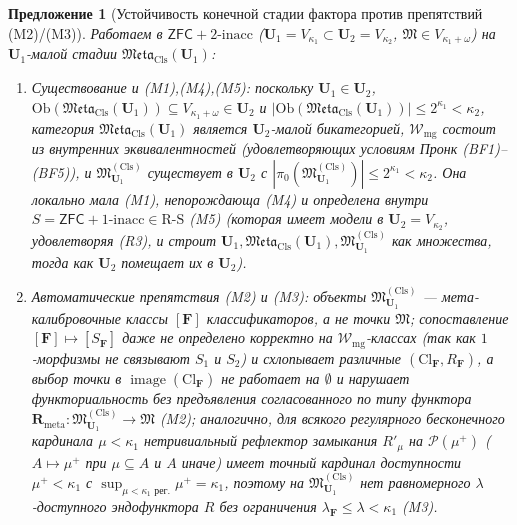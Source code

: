 \documentclass[11pt]{article}
\theoremstyle{plain}
\newtheorem{proposition}[theorem]{Предложение}
\theoremstyle{definition}
\newcommand{\RS}{\mathrm{R\text{-}S}}
\newcommand{\fM}{\mathfrak{M}}
\newcommand{\Meta}{\mathfrak{Meta}}
\newcommand{\Ob}{\mathrm{Ob}}
\newcommand{\Cl}{\mathrm{Cl}}
\newcommand{\ZFC}{\mathsf{ZFC}}
\DeclareMathOperator{\image}{image}
\begin{document}
\begin{proposition}[Устойчивость конечной стадии фактора против препятствий \textup{(M2)/(M3)}]\label{prop:meta-quotient-finite}
Работаем в $\ZFC + 2\text{-inacc}$ ($\mathbf{U}_1 = V_{\kappa_1} \subset \mathbf{U}_2 = V_{\kappa_2}$, $\fM \in V_{\kappa_1+\omega}$) на $\mathbf{U}_1$-малой стадии $\Meta_{\mathrm{Cls}}(\mathbf{U}_1)$:
\begin{enumerate}[nosep,label=(\roman*)]
\item \emph{Существование и \textup{(M1),(M4),(M5)}}: поскольку $\mathbf{U}_1 \in \mathbf{U}_2$, $\Ob(\Meta_{\mathrm{Cls}}(\mathbf{U}_1)) \subseteq V_{\kappa_1+\omega} \in \mathbf{U}_2$ и $|\Ob(\Meta_{\mathrm{Cls}}(\mathbf{U}_1))| \le 2^{\kappa_1} < \kappa_2$, категория $\Meta_{\mathrm{Cls}}(\mathbf{U}_1)$ является $\mathbf{U}_2$-малой бикатегорией, $\mathcal{W}_{\mathrm{mg}}$ состоит из внутренних эквивалентностей (удовлетворяющих условиям Пронк \textup{(BF1)--(BF5)}), и $\fM^{(\mathrm{Cls})}_{\mathbf{U}_1}$ существует в $\mathbf{U}_2$ с $|\pi_0(\fM^{(\mathrm{Cls})}_{\mathbf{U}_1})| \le 2^{\kappa_1} < \kappa_2$. Она локально мала \textup{(M1)}, непорождающа \textup{(M4)} и определена внутри $S = \ZFC + 1\text{-inacc} \in \RS$ \textup{(M5)} (которая имеет модели в $\mathbf{U}_2 = V_{\kappa_2}$, удовлетворяя \textup{(R3)}, и строит $\mathbf{U}_1, \Meta_{\mathrm{Cls}}(\mathbf{U}_1), \fM^{(\mathrm{Cls})}_{\mathbf{U}_1}$ как множества, тогда как $\mathbf{U}_2$ помещает их в $\mathbf{U}_2$).
\item \emph{Автоматические препятствия \textup{(M2)} и \textup{(M3)}}: объекты $\fM^{(\mathrm{Cls})}_{\mathbf{U}_1}$ — мета-калибровочные классы $[\mathbf{F}]$ классификаторов, а не точки $\fM$; сопоставление $[\mathbf{F}] \mapsto [S_{\mathbf{F}}]$ даже не определено корректно на $\mathcal{W}_{\mathrm{mg}}$-классах (так как $1$-морфизмы не связывают $S_1$ и $S_2$) и схлопывает различные $(\Cl_{\mathbf{F}}, R_{\mathbf{F}})$, а выбор точки в $\image(\Cl_{\mathbf{F}})$ не работает на $\emptyset$ и нарушает функториальность без предъявления согласованного по типу функтора $\mathbf{R}_{\mathrm{meta}} : \fM^{(\mathrm{Cls})}_{\mathbf{U}_1} \to \fM$ \textup{(M2)}; аналогично, для всякого регулярного бесконечного кардинала $\mu < \kappa_1$ нетривиальный рефлектор замыкания $R'_\mu$ на $\mathcal{P}(\mu^+)$ ($A \mapsto \mu^+$ при $\mu \subseteq A$ и $A$ иначе) имеет точный кардинал доступности $\mu^+ < \kappa_1$ с $\sup_{\mu < \kappa_1\text{ рег.}} \mu^+ = \kappa_1$, поэтому на $\fM^{(\mathrm{Cls})}_{\mathbf{U}_1}$ нет равномерного $\lambda$-доступного эндофунктора $R$ без ограничения $\lambda_{\mathbf{F}} \le \lambda < \kappa_1$ \textup{(M3)}.
\end{enumerate}
\end{proposition}
\end{document}

